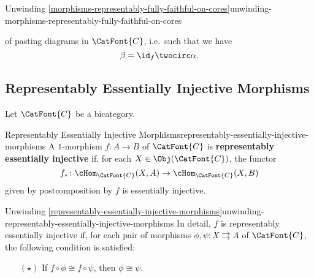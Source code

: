 \begin{remark}{Unwinding \cref{morphisms-representably-fully-faithful-on-cores}}{unwinding-morphisms-representably-fully-faithful-on-cores}
\begin{enumerate}
\begin{webcompile}
\begin{tikzcd}[row sep={5.0*\the\DL,between origins}, column sep={5.0*\the\DL,between origins}, background color=backgroundColor, ampersand replacement=\&]
                    \end{tikzcd}
                \end{webcompile}
                of pasting diagrams in $\CatFont{C}$, i.e.\ such that we have
                \[
                    \beta%
                    =%
                    \id_{f}\twocirc\alpha.%
                \]%
    \end{enumerate}
\end{remark}
\subsection{Representably Essentially Injective Morphisms}\label{subsection-representably-essentially-injective-morphisms}
Let $\CatFont{C}$ be a bicategory.
\begin{definition}{Representably Essentially Injective Morphisms}{representably-essentially-injective-morphisms}%
    A $1$-morphism $f\colon A\to B$ of $\CatFont{C}$ is \textbf{representably essentially injective} if, for each $X\in\Obj(\CatFont{C})$, the functor
    \[
        f_{*}%
        \colon%
        \cHom_{\CatFont{C}}(X,A)%
        \to%
        \cHom_{\CatFont{C}}(X,B)%
    \]%
    given by postcomposition by $f$ is essentially injective.
\end{definition}
\begin{remark}{Unwinding \cref{representably-essentially-injective-morphisms}}{unwinding-representably-essentially-injective-morphisms}%
    In detail, $f$ is representably essentially injective if, for each pair of morphisms $\phi,\psi\colon X\rightrightarrows A$ of $\CatFont{C}$, the following condition is satisfied:
    \begin{itemize}%
        \item[$(\star)$]If $f\circ\phi\cong f\circ\psi$, then $\phi\cong\psi$.
    \end{itemize}%
\end{remark}
